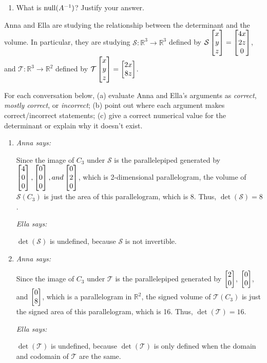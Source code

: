 \begin{exercises}
\begin{problist}
\begin{enumerate}
			\item What is $\operatorname{null}(A^{-1})$? Justify your answer.
		\end{enumerate}
\prob Anna and Ella are studying the relationship between the determinant and the volume. In particular, they are studying $\mathcal{S}:\mathbb{R}^3\rightarrow\mathbb{R}^3$ defined by $\mathcal{S}\begin{bmatrix}x \\ y \\ z\end{bmatrix}=\begin{bmatrix}4x \\ 2z \\ 0\end{bmatrix}$, and $\mathcal{T}:\mathbb{R}^3\rightarrow\mathbb{R}^2$ defined by $\mathcal{T}\begin{bmatrix}x \\ y \\ z\end{bmatrix}=\begin{bmatrix}2x \\ 8z\end{bmatrix}$. 

For each conversation below, (a) evaluate Anna and Ella's arguments as \emph{correct}, \emph{mostly correct}, or \emph{incorrect}; (b) point out where each argument makes correct/incorrect statements; (c) give a correct numerical value for the determinant or explain why it doesn't exist.
\begin{enumerate}
	\item \emph{Anna says:} 

        Since the image of $C_{3}$ under $\mathcal{S}$ is the
		parallelepiped generated by
		$\begin{bmatrix}4 \\ 0 \\ 0\end{bmatrix},\begin{bmatrix}0 \\ 0 \\ 0\end{bmatrix}, and \begin{bmatrix}0 \\ 2 \\ 0\end{bmatrix}$, which is
		2-dimensional parallelogram, the volume of $\mathcal{S}(C_{3})$ is just
		the area of this parallelogram, which is 8. Thus, $\det(\mathcal{S})=8$.

		\emph{Ella says:} 

        $\det(\mathcal{S})$ is undefined, because $\mathcal{S}$ is not invertible. 

	\item \emph{Anna says:} 

        Since the image of $C_{3}$ under $\mathcal{T}$ is the
		parallelepiped generated by $\begin{bmatrix}2 \\ 0\end{bmatrix}$, $\begin{bmatrix}0 \\ 0\end{bmatrix}$, and
		$\begin{bmatrix}0 \\ 8\end{bmatrix}$, which is a parallelogram in $\mathbb{R}^{2}$, the
		signed volume of $\mathcal{T}(C_{3})$ is just the signed area of this
		parallelogram, which is 16. Thus, $\det(\mathcal{T})=16$. 

        \emph{Ella says:} 
        
        $\det(\mathcal{T})$ is undefined, because
		$\det(\mathcal{T})$ is only defined when the domain and codomain of
		$\mathcal{T}$ are the same.
\end{enumerate}
	\end{problist}
\end{exercises}


